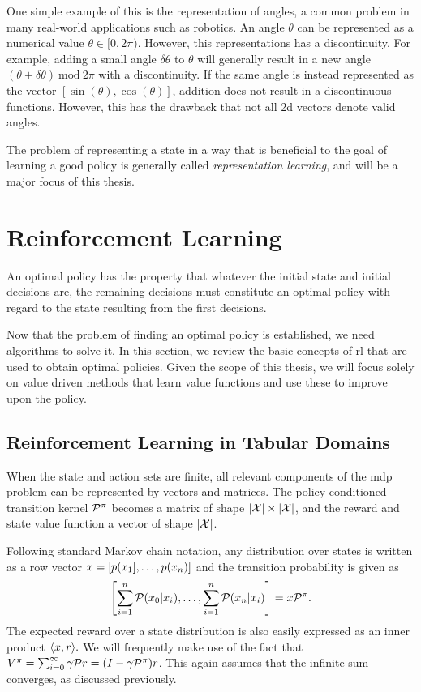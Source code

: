 One simple example of this is the representation of angles, a common problem in many real-world applications such as robotics.
An angle $\theta$ can be represented as a numerical value $\theta \in [0,2\pi)$.
However, this representations has a discontinuity.
For example, adding a small angle $\delta\theta$ to $\theta$ will generally result in a new angle $(\theta + \delta\theta)~\mathrm{mod}~2\pi$ with a discontinuity.
If the same angle is instead represented as the vector $[\sin(\theta),\cos(\theta)]$, addition does not result in a discontinuous functions.
However, this has the drawback that not all 2d vectors denote valid angles.

The problem of representing a state in a way that is beneficial to the goal of learning a good policy is generally called \emph{representation learning}, and will be a major focus of this thesis.


\section{Reinforcement Learning}
\label{chap:background:rl}

\epigraph{An optimal policy has the property that whatever the initial state and initial decisions are, the remaining decisions must constitute an optimal policy with regard to the state resulting from the first decisions.}{\cite{bellman1953}}

Now that the problem of finding an optimal policy is established, we need algorithms to solve it.
In this section, we review the basic concepts of \ac{rl} that are used to obtain optimal policies.
Given the scope of this thesis, we will focus solely on value driven methods that learn value functions and use these to improve upon the policy.

\subsection{Reinforcement Learning in Tabular Domains}

When the state and action sets are finite, all relevant components of the \ac{mdp} problem can be represented by vectors and matrices.
The policy-conditioned transition kernel $\P^\pi$ becomes a matrix of shape $|\X| \times |\X|$, and the reward and state value function a vector of shape $|\X|$.

Following standard Markov chain notation, any distribution over states is written as a row vector $\state = [p(\state_1],\dots, p(\state_n)]$ and the transition probability is given as $$\left[\sum_{i=1}^n \P(\state_0|\state_i), \dots, \sum_{i=1}^n \P(\state_n|\state_i)\right] = \state \P^\pi.$$
The expected reward over a state distribution is also easily expressed as an inner product $\langle \state,r\rangle.$
We will frequently make use of the fact that $V^\pi = \sum_{i=0}^\infty \gamma \P r = (I - \gamma \P^\pi)r$.
This again assumes that the infinite sum converges, as discussed previously.


